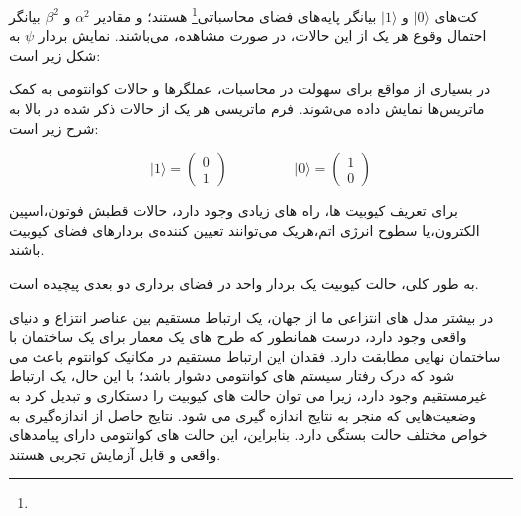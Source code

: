 \documentclass{book}
\begin{document}
کت‌های $\vert 0 \rangle$ و $\vert 1 \rangle$ بیانگر پایه‌های فضای محاسباتی\footnote{} هستند؛ و مقادیر $\alpha^2$ و $\beta^2$ بیانگر احتمال وقوع هر یک از این حالات، در صورت مشاهده، می‌باشند. نمایش بردار $\psi$ به شکل زیر است:
\begin{center}
\end{center}

در بسیاری از مواقع برای سهولت در محاسبات، عملگر‌ها و حالات کوانتومی به کمک ماتریس‌ها نمایش داده ‌می‌شوند. فرم ماتریسی هر یک از حالات ذکر شده در بالا به شرح زیر است:

\begin{equation}\label{basis ket}
	\vert 1 \rangle = \begin{pmatrix} 0 \\ 1 \end{pmatrix}
	\hspace{2cm}
	\vert 0 \rangle = \begin{pmatrix} 1 \\ 0 \end{pmatrix}	
\end{equation}

برای تعریف کیوبیت ها، راه های زیادی وجود دارد، حالات قطبش فوتون،‌اسپین الکترون،‌یا سطوح انرژی اتم،‌هریک می‌توانند تعیین کننده‌ی بردار‌های فضای کیوبیت باشند.

 به طور کلی، حالت کیوبیت یک بردار واحد در فضای برداری دو بعدی پیچیده است.\pagebreak
 
در بیشتر مدل های انتزاعی ما از جهان، یک ارتباط مستقیم بین عناصر انتزاع و دنیای واقعی وجود دارد، درست همانطور که طرح های یک معمار برای یک ساختمان با ساختمان نهایی مطابقت دارد. فقدان این ارتباط مستقیم در مکانیک کوانتوم باعث می شود که درک رفتار سیستم های کوانتومی دشوار باشد؛ با این حال، یک ارتباط غیرمستقیم وجود دارد، زیرا می توان حالت های کیوبیت را دستکاری و تبدیل کرد به وضعیت‌هایی که منجر به نتایج اندازه گیری می شود. نتایج حاصل از اندازه‌گیری به خواص مختلف حالت بستگی دارد. بنابراین، این حالت های کوانتومی دارای پیامدهای واقعی و قابل آزمایش تجربی هستند.
\end{document}
